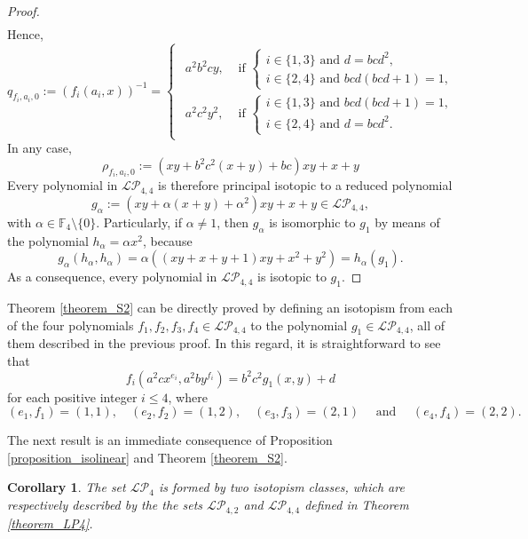 \documentclass[pdflatex,sn-mathphys-num]{sn-jnl}
\theoremstyle{thmstyleone}%
\newtheorem{corollary}{Corollary}[section]
\begin{document}
\begin{proof}
\begin{align*}
\end{align*}
Hence,
\[q_{f_i,a_i,0}:=\left(f_i(a_i,x)\right)^{-1}= \begin{cases}\begin{array}{ll}
    a^2b^2cy, & \text{ if } \begin{cases}i\in\{1,3\} \text{ and } d=bcd^2,\\
    i\in\{2,4\} \text{ and } bcd(bcd+1)=1,
    \end{cases}\\
    a^2c^2y^2, & \text{ if } \begin{cases}
     i\in\{1,3\} \text{ and } bcd(bcd+1)=1,\\
     i\in\{2,4\} \text{ and } d=bcd^2.
    \end{cases}
    \end{array}
    \end{cases}\]
In any case, 
\[\rho_{f_i,a_i,0}:=(xy+b^2c^2(x+y)+bc)xy+x+y\]
Every polynomial in $\mathcal{LP}_{4,4}$ is therefore principal isotopic to a reduced polynomial
\[g_\alpha:=(xy+\alpha(x+y)+\alpha^2)xy+x+y\in\mathcal{LP}_{4,4},\]
with $\alpha\in\mathbb{F}_4\setminus\{0\}$. Particularly, if $\alpha\neq 1$, then $g_\alpha$ is isomorphic to $g_1$ by means of the polynomial $h_\alpha=\alpha x^2$, because
\[g_\alpha(h_\alpha,h_\alpha)=\alpha\left((xy+x+y+1)xy+x^2+y^2\right)=h_\alpha(g_1).\]
As a consequence, every polynomial in $\mathcal{LP}_{4,4}$ is isotopic to $g_1$.
\end{proof}

\vspace{0.2cm}

Theorem \ref{theorem_S2}  can be directly proved by defining an isotopism from each of the four polynomials $f_1,f_2,f_3,f_4\in\mathcal{LP}_{4,4}$ to the polynomial $g_1\in\mathcal{LP}_{4,4}$, all of them described in the previous proof. In this regard, it is straightforward to see that 
\[f_i\left(a^2cx^{e_i},a^2by^{f_i}\right)=b^2c^2g_1(x,y)+d\]
for each positive integer $i\leq 4$, where 
\[(e_1,f_1)=(1,1),\quad (e_2,f_2)=(1,2),\quad (e_3,f_3)=(2,1) \quad \text{ and } \quad (e_4,f_4)=(2,2).\]

\vspace{0.2cm}

The next result is an immediate consequence of Proposition \ref{proposition_isolinear} and Theorem \ref{theorem_S2}.

\begin{corollary}\label{corollary_S1S2} The set $\mathcal{LP}_4$ is formed by two isotopism classes, which are respectively described by the the sets $\mathcal{LP}_{4,2}$ and $\mathcal{LP}_{4,4}$ defined in Theorem \ref{theorem_LP4}.
\end{corollary}
\end{document}
